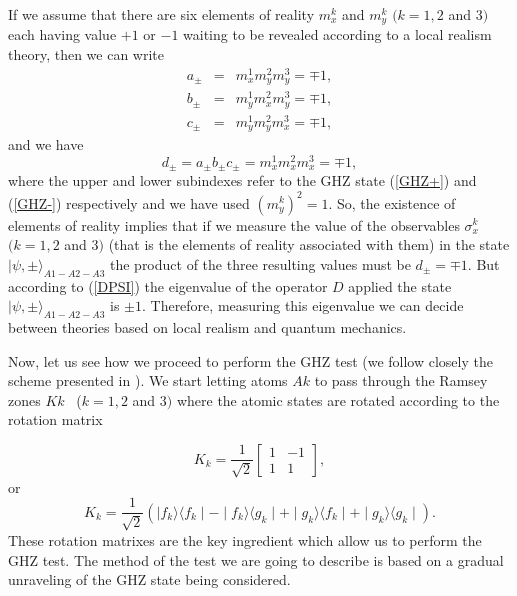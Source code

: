 \documentclass[12pt,thmsa]{article}
\begin{document}
If we assume that there are six elements of reality $m_{x}^{k}$ and $%
m_{y}^{k}$ $(k=1,2$ and $3)$ each having value $+1$ or $-1$ waiting to be
revealed according to a local realism theory, then we can write%
\begin{eqnarray}
a_{\pm } &=&m_{x}^{1}m_{y}^{2}m_{y}^{3}=\mp 1,  \nonumber \\
b_{\pm } &=&m_{y}^{1}m_{x}^{2}m_{y}^{3}=\mp 1,  \nonumber \\
c_{\pm } &=&m_{y}^{1}m_{y}^{2}m_{x}^{3}=\mp 1,
\end{eqnarray}%
and we have%
\begin{equation}
d_{\pm }=a_{\pm }b_{\pm }c_{\pm }=m_{x}^{1}m_{x}^{2}m_{x}^{3}=\mp 1,
\end{equation}%
where the upper and lower subindexes refer to the GHZ state (\ref{GHZ+}) and
(\ref{GHZ-}) respectively and we have used $(m_{y}^{k})^{2}=1$. So, the
existence of elements of reality implies that if we measure the value of the
observables $\sigma _{x}^{k}$ $(k=1,2$ and $3)$ (that is the elements of
reality associated with them) in the state $\mid \psi ,\pm \rangle
_{A1-A2-A3}$ the product of the three resulting values must be $d_{\pm }=\mp
1$. But according to (\ref{DPSI}) the eigenvalue of the operator $D$ applied
the state $\mid \psi ,\pm \rangle _{A1-A2-A3}$ is $\pm 1$. Therefore,
measuring this eigenvalue we can decide between theories based on local
realism and quantum mechanics.

Now, let us see how we proceed to perform the GHZ test (we follow closely
the scheme presented in \cite{GHZLambdaat}). We start letting atoms $Ak$ to
pass through the Ramsey zones $Kk$ \ ($k=1,2$ and $3)$ where the atomic
states are rotated according to the rotation matrix

\begin{equation}
K_{k}=\frac{1}{\sqrt{2}}\left[ 
\begin{array}{cc}
1 & -1 \\ 
1 & 1%
\end{array}%
\right] ,
\end{equation}%
or%
\begin{equation}
K_{k}=\frac{1}{\sqrt{2}}(\mid f_{k}\rangle \langle f_{k}\mid -\mid
f_{k}\rangle \langle g_{k}\mid +\mid g_{k}\rangle \langle f_{k}\mid +\mid
g_{k}\rangle \langle g_{k}\mid ).  \label{Kk}
\end{equation}%
These rotation matrixes are the key ingredient which allow us to perform the
GHZ test. The method of the test we are going to describe is based on a
gradual unraveling of the GHZ state being considered.
\end{document}
